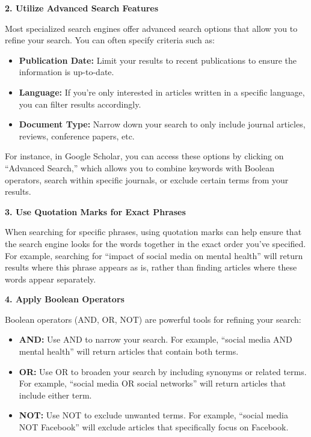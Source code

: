 \documentclass[
]{book}
\providecommand{\tightlist}{%
  \setlength{\itemsep}{0pt}\setlength{\parskip}{0pt}}
\begin{document}
\textbf{2. Utilize Advanced Search Features}

Most specialized search engines offer advanced search options that allow you to refine your search. You can often specify criteria such as:

\begin{itemize}
\tightlist
\item
  \textbf{Publication Date:} Limit your results to recent publications to ensure the information is up-to-date.
\item
  \textbf{Language:} If you're only interested in articles written in a specific language, you can filter results accordingly.
\item
  \textbf{Document Type:} Narrow down your search to only include journal articles, reviews, conference papers, etc.
\end{itemize}

For instance, in Google Scholar, you can access these options by clicking on ``Advanced Search,'' which allows you to combine keywords with Boolean operators, search within specific journals, or exclude certain terms from your results.

\textbf{3. Use Quotation Marks for Exact Phrases}

When searching for specific phrases, using quotation marks can help ensure that the search engine looks for the words together in the exact order you've specified. For example, searching for ``impact of social media on mental health'' will return results where this phrase appears as is, rather than finding articles where these words appear separately.

\textbf{4. Apply Boolean Operators}

Boolean operators (AND, OR, NOT) are powerful tools for refining your search:

\begin{itemize}
\tightlist
\item
  \textbf{AND:} Use AND to narrow your search. For example, ``social media AND mental health'' will return articles that contain both terms.
\item
  \textbf{OR:} Use OR to broaden your search by including synonyms or related terms. For example, ``social media OR social networks'' will return articles that include either term.
\item
  \textbf{NOT:} Use NOT to exclude unwanted terms. For example, ``social media NOT Facebook'' will exclude articles that specifically focus on Facebook.
\end{itemize}
\end{document}
